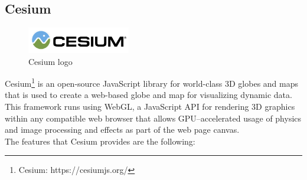 \subsection{Cesium}
\begin{figure} [h]
\centering
\includegraphics[width=0.4\textwidth]{chapter2/images/cesium_logo}
\caption{Cesium logo}
\label{fig:cesium_logo}
\end{figure}
Cesium\footnote{Cesium: https://cesiumjs.org/} is an open-source JavaScript library for world-class 3D globes and maps that is used to create a web-based globe and map for visualizing dynamic data. This framework runs using WebGL, a JavaScript API for rendering 3D graphics within any compatible web browser that allows GPU--accelerated usage of physics and image processing and effects as part of the web page canvas.\\ 
The features that Cesium provides are the following:
